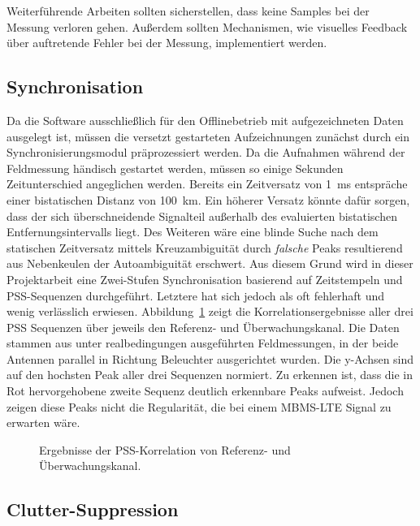 Weiterführende Arbeiten sollten sicherstellen, dass keine Samples bei der Messung verloren gehen. Außerdem sollten Mechanismen, wie visuelles Feedback über auftretende Fehler bei der Messung, implementiert werden.

\subsection{Synchronisation}

Da die Software ausschließlich für den Offlinebetrieb mit aufgezeichneten Daten ausgelegt ist, müssen die versetzt gestarteten Aufzeichnungen zunächst durch ein Synchronisierungsmodul präprozessiert werden. Da die Aufnahmen während der Feldmessung händisch gestartet werden, müssen so einige Sekunden Zeitunterschied angeglichen werden. Bereits ein Zeitversatz von \SI{1}{\milli\second} entspräche einer bistatischen Distanz von \SI{100}{\kilo\metre}. Ein höherer Versatz könnte dafür sorgen, dass der sich überschneidende Signalteil außerhalb des evaluierten bistatischen Entfernungsintervalls liegt. Des Weiteren wäre eine blinde Suche nach dem statischen Zeitversatz mittels Kreuzambiguität durch \emph{falsche} Peaks resultierend aus Nebenkeulen der Autoambiguität erschwert. Aus diesem Grund wird in dieser Projektarbeit eine Zwei-Stufen Synchronisation basierend auf Zeitstempeln und PSS-Sequenzen durchgeführt. Letztere hat sich jedoch als oft fehlerhaft und wenig verlässlich erwiesen. Abbildung~\ref{fig:pss_correlation_results} zeigt die Korrelationsergebnisse aller drei PSS Sequenzen über jeweils den Referenz- und Überwachungskanal. Die Daten stammen aus unter realbedingungen ausgeführten Feldmessungen, in der beide Antennen parallel in Richtung Beleuchter ausgerichtet wurden. Die y-Achsen sind auf den hochsten Peak aller drei Sequenzen normiert. Zu erkennen ist, dass die in Rot hervorgehobene zweite Sequenz deutlich erkennbare Peaks aufweist. Jedoch zeigen diese Peaks nicht die Regularität, die bei einem MBMS-LTE Signal zu erwarten wäre.

\begin{figure}[htb]
    \centering
    
    \caption{Ergebnisse der PSS-Korrelation von Referenz- und Überwachungskanal.}\label{fig:pss_correlation_results}
\end{figure}

\subsection{Clutter-Suppression}

